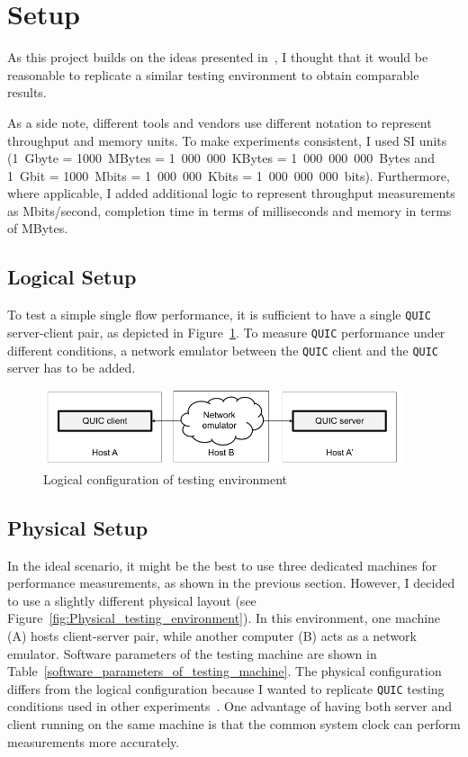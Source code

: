 \documentclass[12pt,a4paper]{report}
\begin{document}
\section{Setup}

As this project builds on the ideas presented in~\cite{Making_QUIC_Quicker}, I thought that it would be reasonable to replicate a similar testing environment to obtain comparable results.

As a side note, different tools and vendors use different notation to represent throughput and memory units.
To make experiments consistent, I used SI units (1~Gbyte = 1000~MBytes = 1~000~000~KBytes = 1~000~000~000~Bytes and 1~Gbit = 1000~Mbits = 1~000~000~Kbits = 1~000~000~000~bits).
Furthermore, where applicable, I added additional logic to represent throughput measurements as Mbits/second, completion time in terms of milliseconds and memory in terms of MBytes.

\subsection{Logical Setup}
To test a simple single flow performance, it is sufficient to have a single \texttt{QUIC} server-client pair, as depicted in Figure~\ref{fig:Logical_testing_environment}.
To measure \texttt{QUIC} performance under different conditions, a network emulator between the \texttt{QUIC} client and the \texttt{QUIC} server has to be added.

    \begin{figure}[ht]
    \centering
    \includegraphics[width=0.95\textwidth]{figs/Logical_testing_environment.png}
    \caption{Logical configuration of testing environment}
    \label{fig:Logical_testing_environment}
    \end{figure}

\subsection{Physical Setup} \label{physical_setup_subsection}


    In the ideal scenario, it might be the best to use three dedicated machines for performance measurements, as shown in the previous section.
    However, I decided to use a slightly different physical layout (see Figure~\ref{fig:Physical_testing_environment}).
    In this environment, one machine (A) hosts client-server pair, while another computer (B) acts as a network emulator.
    Software parameters of the testing machine are shown in Table~\ref{software_parameters_of_testing_machine}.
    The physical configuration differs from the logical configuration because I wanted to replicate \texttt{QUIC} testing conditions used in other experiments~\cite{Making_QUIC_Quicker}.
    One advantage of having both server and client running on the same machine is that the common system clock can perform measurements more accurately. 
    
\end{document}
